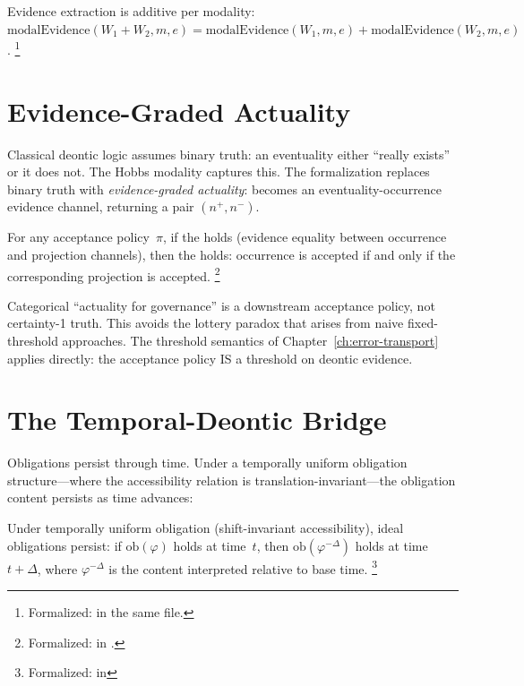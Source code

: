 \documentclass[11pt,openany]{report}
\begin{document}
\noindent
Evidence extraction is additive per modality:
$\mathrm{modalEvidence}(W_1 + W_2, m, e) =
\mathrm{modalEvidence}(W_1, m, e) +
\mathrm{modalEvidence}(W_2, m, e)$.%
\footnote{Formalized:  in the same file.}


\section{Evidence-Graded Actuality}

Classical deontic logic assumes binary truth: an eventuality either
``really exists'' or it does not.  The Hobbs  modality
captures this.  The formalization replaces binary truth with
\emph{evidence-graded actuality}:  becomes an
eventuality-occurrence evidence channel, returning a
 pair $(n^+, n^-)$.

\begin{theorem}
\label{thm:acceptance-bridge}
For any acceptance policy~$\pi$, if the  holds
(evidence equality between occurrence and projection channels),
then the  holds: occurrence is accepted
if and only if the corresponding projection is accepted.%
\footnote{Formalized:
 in
.}
\end{theorem}

\noindent
Categorical ``actuality for governance'' is a downstream acceptance
policy, not certainty-1 truth.  This avoids the lottery paradox that
arises from naive fixed-threshold approaches.  The threshold
semantics of Chapter~\ref{ch:error-transport} applies directly:
the acceptance policy IS a threshold on deontic evidence.


\section{The Temporal-Deontic Bridge}

Obligations persist through time.  Under a temporally uniform
obligation structure---where the accessibility relation is
translation-invariant---the obligation content persists as time
advances:

\begin{theorem}
\label{thm:obligation-persistence}
Under temporally uniform obligation (shift-invariant accessibility),
ideal obligations persist: if $\mathrm{ob}(\varphi)$ holds at
time~$t$, then $\mathrm{ob}(\varphi^{-\Delta})$ holds at
time~$t + \Delta$, where $\varphi^{-\Delta}$ is the content
interpreted relative to base time.%
\footnote{Formalized:
 in
}
\end{theorem}
\end{document}
